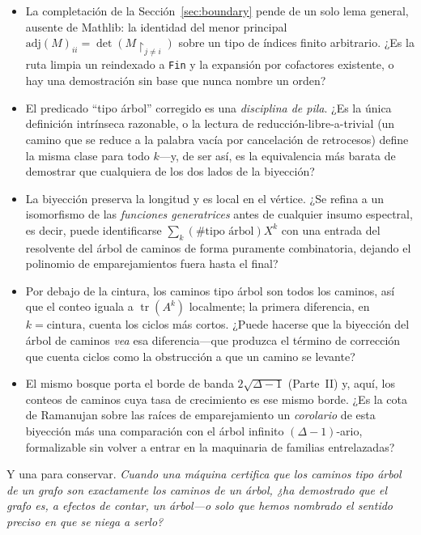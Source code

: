 \documentclass[11pt]{article}
\newcommand{\lean}[1]{\texttt{#1}}
\DeclareMathOperator{\tr}{tr}
\begin{document}
\begin{itemize}
\item La completaci\'on de la Secci\'on~\ref{sec:boundary} pende de un solo lema general, ausente de
Mathlib: la identidad del menor principal $\mathrm{adj}(M)_{ii}=\det(M\!\restriction_{j\neq i})$ sobre un
tipo de \'indices finito arbitrario. ¿Es la ruta limpia un reindexado a \lean{Fin} y la expansi\'on por
cofactores existente, o hay una demostraci\'on sin base que nunca nombre un orden?
\item El predicado ``tipo \'arbol'' corregido es una \emph{disciplina de pila}. ¿Es la \'unica
definici\'on intr\'inseca razonable, o la lectura de reducci\'on-libre-a-trivial (un camino que se reduce
a la palabra vac\'ia por cancelaci\'on de retrocesos) define la misma clase para todo $k$---y, de ser
as\'i, es la equivalencia m\'as barata de demostrar que cualquiera de los dos lados de la biyecci\'on?
\item La biyecci\'on preserva la longitud y es local en el v\'ertice. ¿Se refina a un isomorfismo de las
\emph{funciones generatrices} antes de cualquier insumo espectral, es decir, puede identificarse
$\sum_k(\#\text{tipo \'arbol})X^k$ con una entrada del resolvente del \'arbol de caminos de forma
puramente combinatoria, dejando el polinomio de emparejamientos fuera hasta el final?
\item Por debajo de la cintura, los caminos tipo \'arbol son todos los caminos, as\'i que el conteo
iguala a $\tr(A^k)$ localmente; la primera diferencia, en $k=\text{cintura}$, cuenta los ciclos m\'as
cortos. ¿Puede hacerse que la biyecci\'on del \'arbol de caminos \emph{vea} esa diferencia---que produzca
el t\'ermino de correcci\'on que cuenta ciclos como la obstrucci\'on a que un camino se levante?
\item El mismo bosque porta el borde de banda $2\sqrt{\Delta-1}$ (Parte~II) y, aqu\'i, los conteos de
caminos cuya tasa de crecimiento es ese mismo borde. ¿Es la cota de Ramanujan sobre las ra\'ices de
emparejamiento un \emph{corolario} de esta biyecci\'on m\'as una comparaci\'on con el \'arbol infinito
$(\Delta-1)$-ario, formalizable sin volver a entrar en la maquinaria de familias entrelazadas?
\end{itemize}

Y una para conservar. \emph{Cuando una m\'aquina certifica que los caminos tipo \'arbol de un grafo son
exactamente los caminos de un \'arbol, ¿ha demostrado que el grafo es, a efectos de contar, un \'arbol---o
solo que hemos nombrado el sentido preciso en que se niega a serlo?}
\end{document}
